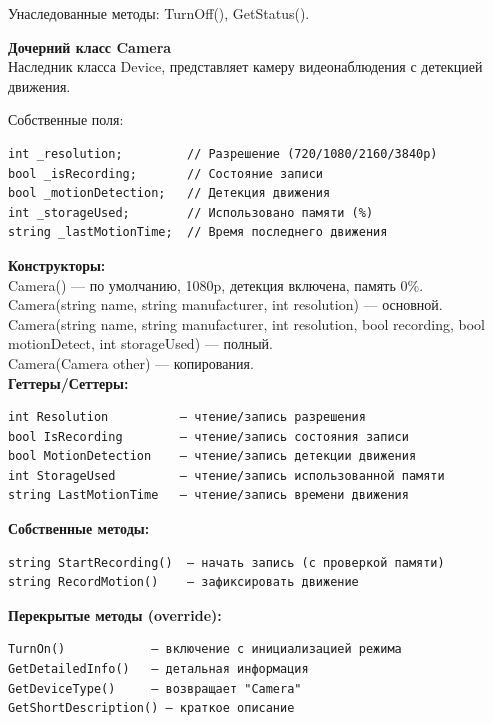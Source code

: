 \documentclass[oneside,a4paper,14pt]{extarticle}
\begin{document}
Унаследованные методы: TurnOff(), GetStatus().

\newpage

\textbf{Дочерний класс Camera}\\

Наследник класса Device, представляет камеру видеонаблюдения с детекцией движения.

Собственные поля:

\begin{verbatim}
int _resolution;         // Разрешение (720/1080/2160/3840p)
bool _isRecording;       // Состояние записи
bool _motionDetection;   // Детекция движения
int _storageUsed;        // Использовано памяти (%)
string _lastMotionTime;  // Время последнего движения
\end{verbatim}

\textbf{Конструкторы:}\\

Camera() — по умолчанию, 1080p, детекция включена, память 0\%.\\

Camera(string name, string manufacturer, int resolution) — основной.\\

Camera(string name, string manufacturer, int resolution, bool recording, bool motionDetect, int storageUsed) — полный.\\

Camera(Camera other) — копирования.\\

\textbf{Геттеры/Сеттеры:}

\begin{verbatim}
int Resolution          — чтение/запись разрешения
bool IsRecording        — чтение/запись состояния записи
bool MotionDetection    — чтение/запись детекции движения
int StorageUsed         — чтение/запись использованной памяти
string LastMotionTime   — чтение/запись времени движения
\end{verbatim}

\textbf{Собственные методы:}

\begin{verbatim}
string StartRecording()  — начать запись (с проверкой памяти)
string RecordMotion()    — зафиксировать движение
\end{verbatim}

\textbf{Перекрытые методы (override):}

\begin{verbatim}
TurnOn()            — включение с инициализацией режима
GetDetailedInfo()   — детальная информация
GetDeviceType()     — возвращает "Camera"
GetShortDescription() — краткое описание
\end{verbatim}
\end{document}
